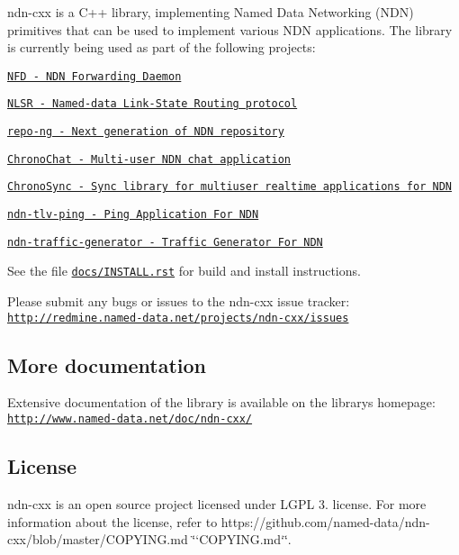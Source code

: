 ndn-\/cxx is a C++ library, implementing Named Data Networking (N\+DN) primitives that can be used to implement various N\+DN applications. The library is currently being used as part of the following projects\+:


\begin{DoxyItemize}
\item \href{https://github.com/named-data/NFD}{\tt N\+FD -\/ N\+DN Forwarding Daemon}
\item \href{https://github.com/named-data/NLSR}{\tt N\+L\+SR -\/ Named-\/data Link-\/\+State Routing protocol}
\item \href{https://github.com/named-data/repo-ng}{\tt repo-\/ng -\/ Next generation of N\+DN repository}
\item \href{https://github.com/named-data/ChronoChat}{\tt Chrono\+Chat -\/ Multi-\/user N\+DN chat application}
\item \href{https://github.com/named-data/ChronoSync}{\tt Chrono\+Sync -\/ Sync library for multiuser realtime applications for N\+DN}
\item \href{https://github.com/named-data/ndn-tlv-ping}{\tt ndn-\/tlv-\/ping -\/ Ping Application For N\+DN}
\item \href{https://github.com/named-data/ndn-traffic-generator}{\tt ndn-\/traffic-\/generator -\/ Traffic Generator For N\+DN}
\end{DoxyItemize}

See the file \href{https://github.com/cawka/ndn-cxx/blob/master/docs/INSTALL.rst}{\tt {\ttfamily docs/\+I\+N\+S\+T\+A\+L\+L.\+rst}} for build and install instructions.

Please submit any bugs or issues to the ndn-\/cxx issue tracker\+: \href{http://redmine.named-data.net/projects/ndn-cxx/issues}{\tt http\+://redmine.\+named-\/data.\+net/projects/ndn-\/cxx/issues}

\subsection*{More documentation}

Extensive documentation of the library is available on the library\textquotesingle{}s homepage\+: \href{http://www.named-data.net/doc/ndn-cxx/}{\tt http\+://www.\+named-\/data.\+net/doc/ndn-\/cxx/}

\subsection*{License}

ndn-\/cxx is an open source project licensed under L\+G\+PL 3. license. For more information about the license, refer to https\+://github.com/named-\/data/ndn-\/cxx/blob/master/\+C\+O\+P\+Y\+I\+N\+G.\+md \char`\"{}`\+C\+O\+P\+Y\+I\+N\+G.\+md`\char`\"{}. 